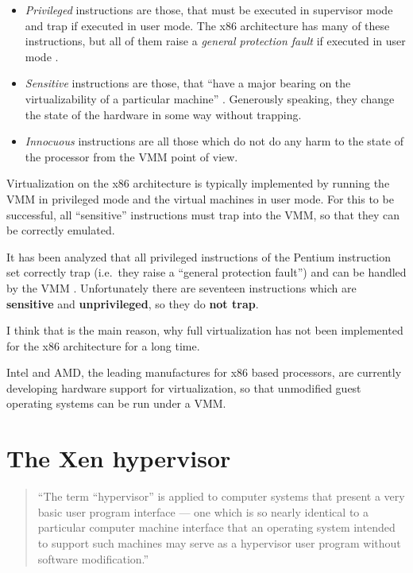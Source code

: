 \begin{itemize}
\item \emph{Privileged}  instructions are those, that must  be executed in
  supervisor mode and trap if  executed in user mode. The x86 architecture
  has many  of these instructions, but  all of them  raise a \emph{general
    protection fault} if executed in user mode \cite{robin00analysis}.
  
\item \emph{Sensitive} instructions are those, that ``have a major bearing
  on     the     virtualizability     of    a     particular     machine''
  \cite{popek74}.  Generously  speaking,  they  change the  state  of  the
  hardware in some way without trapping.
  
\item \emph{Innocuous} instructions are all those which do not do any harm
  to the state of the processor from the VMM point of view.
\end{itemize}

Virtualization on the x86 architecture is typically implemented by running
the VMM in privileged mode and the virtual machines in user mode. For this
to  be successful,  all ``sensitive''  instructions \cite{popek74,popek75}
must trap into the VMM, so that they can be correctly emulated.

It  has been  analyzed that  all  privileged instructions  of the  Pentium
instruction  set correctly  trap (i.e.~they  raise a  ``general protection
fault'')   and  can   be  handled   by  the   VMM  \cite{robin00analysis}.
Unfortunately    there    are    seventeen    instructions    which    are
\textbf{sensitive}  and  \textbf{unprivileged},  so  they  do  \textbf{not
  trap}.

I think  that is  the main  reason, why full  virtualization has  not been
implemented for the x86 architecture for a long time.

Intel  and AMD,  the leading  manufactures for  x86 based  processors, are
currently  developing   hardware  support  for   virtualization,  so  that
unmodified guest operating systems can be run under a VMM.

\section{The Xen hypervisor}
\label{sec:xen-hypervisor}

\begin{quote}
  ``The term “hypervisor” is applied to computer systems that present a very
basic user  program interface ---  one which is  so nearly identical  to a
particular computer machine interface that an operating system intended to
support  such machines  may serve  as  a hypervisor  user program  without
software modification.'' \cite{hendricks79}
\end{quote}

